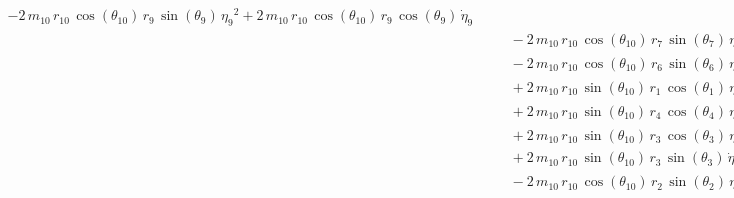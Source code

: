 \begin{eqnarray*}
 - 2\,m_{10}\,r_{10}\,\cos({\theta_{10}})\,r_{9}\,\sin({\theta_{9}})\,
{{\eta_{9}}}^2 + 2\,m_{10}\,r_{10}\,\cos({\theta_{10}})\,r_{9}\,\cos({
\theta_{9}})\,{\dot{\eta}_{9}} \\ &&\quad\mbox{} - 2\,m_{10}\,r_{10}\,
\cos({\theta_{10}})\,r_{7}\,\sin({\theta_{7}})\,{{\eta_{7}}}^2 + 2\,m
_{10}\,r_{10}\,\cos({\theta_{10}})\,r_{7}\,\cos({\theta_{7}})\,{
\dot{\eta}_{7}} \\ &&\quad\mbox{} - 2\,m_{10}\,r_{10}\,\cos({\theta_{
10}})\,r_{6}\,\sin({\theta_{6}})\,{{\eta_{6}}}^2 + 2\,m_{10}\,r_{10}\,
\cos({\theta_{10}})\,r_{6}\,\cos({\theta_{6}})\,{\dot{\eta}_{6}}
 \\ &&\quad\mbox{} + 2\,m_{10}\,r_{10}\,\sin({\theta_{10}})\,r_{1}\,
\cos({\theta_{1}})\,{{\eta_{1}}}^2 + 2\,m_{10}\,r_{10}\,\sin({\theta_{
10}})\,r_{1}\,\sin({\theta_{1}})\,{\dot{\eta}_{1}} \\ &&\quad\mbox{}
 + 2\,m_{10}\,r_{10}\,\sin({\theta_{10}})\,r_{4}\,\cos({\theta_{4}})\,
{{\eta_{4}}}^2 + 2\,m_{10}\,r_{10}\,\sin({\theta_{10}})\,r_{4}\,\sin({
\theta_{4}})\,{\dot{\eta}_{4}} \\ &&\quad\mbox{} + 2\,m_{10}\,r_{10}\,
\sin({\theta_{10}})\,r_{3}\,\cos({\theta_{3}})\,{{\eta_{3}}}^2 - 2\,m
_{10}\,r_{10}\,\cos({\theta_{10}})\,r_{4}\,\sin({\theta_{4}})\,{{\eta
_{4}}}^2 \\ &&\quad\mbox{} + 2\,m_{10}\,r_{10}\,\sin({\theta_{10}})\,r
_{3}\,\sin({\theta_{3}})\,{\dot{\eta}_{3}} + 2\,m_{10}\,r_{10}\,\cos({
\theta_{10}})\,r_{3}\,\cos({\theta_{3}})\,{\dot{\eta}_{3}}
 \\ &&\quad\mbox{} - 2\,m_{10}\,r_{10}\,\cos({\theta_{10}})\,r_{2}\,
\sin({\theta_{2}})\,{{\eta_{2}}}^2 \end{eqnarray*}

